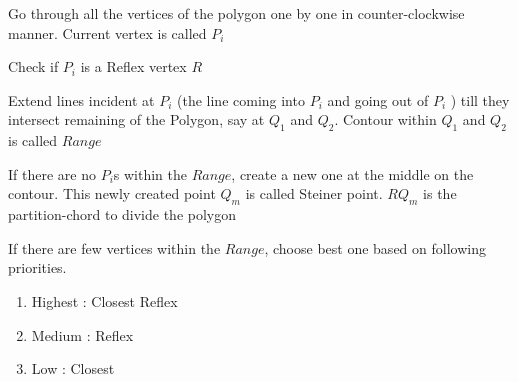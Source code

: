 \begin{list}{}{}

\item 
Go through all the vertices of the polygon one by one in counter-clockwise manner. Current vertex is called $P_i$ %


\item 
Check if $P_i$ is a Reflex vertex $R$  %




\item 
Extend lines incident at $P_i$ (the line coming into $P_i$ and going out of $P_i$ ) till they intersect remaining of the Polygon, say at $Q_1$ and $Q_2$. Contour within $Q_1$ and $Q_2$ is called $Range$ %


\item 
If there are no $P_i$s within the $Range$, create a new one at the middle on the contour. This newly created point  $Q_m$ is called Steiner point.  $RQ_m$ is the partition-chord to divide the polygon %


\item 
If there are few vertices within the $Range$, choose best one based on following priorities.
\begin{enumerate}
\item Highest : Closest Reflex 
\item Medium : Reflex 
\item Low : Closest 
\end{enumerate} 


\end{list}
